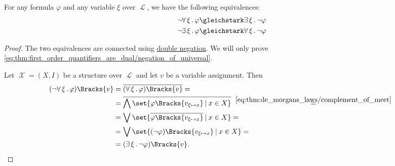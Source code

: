 \begin{proposition}\label{thm:first_order_quantifiers_are_dual}
  For any formula \( \varphi \) and any variable \( \xi \) over \( \mscrL \), we have the following equivalences:
  \begin{align}
    \neg \qforall \xi \varphi &\gleichstark \qexists \xi \neg \varphi \label{eq:thm:first_order_quantifiers_are_dual/negation_of_universal} \\
    \neg \qexists \xi \varphi &\gleichstark \qforall \xi \neg \varphi \label{eq:thm:first_order_quantifiers_are_dual/negation_of_existential}
  \end{align}
\end{proposition}
\begin{proof}
  The two equivalences are connected using \hyperref[thm:boolean_equivalences/double_negation]{double negation}. We will only prove \eqref{eq:thm:first_order_quantifiers_are_dual/negation_of_universal}.

  Let \( \mscrX = (X, I) \) be a structure over \( \mscrL \) and let \( v \) be a variable assignment. Then
  \begin{align*}
    (\neg \qforall \xi \varphi)\Bracks{v}
    &=
    \overline{(\qforall \xi \varphi)\Bracks{v}}
    = \\ &=
    \overline{\bigwedge\set{ \varphi\Bracks{v_{\xi \mapsto x}} \given x \in X }}
    \reloset {\eqref{eq:thm:de_morgans_laws/complement_of_meet}} = \\ &=
    \bigvee\set{ \overline{\varphi\Bracks{v_{\xi \mapsto x}}} \given x \in X }
    = \\ &=
    \bigvee\set{ (\neg \varphi)\Bracks{v_{\xi \mapsto x}} \given x \in X }
    = \\ &=
    (\qexists \xi \neg \varphi)\Bracks{v}.
  \end{align*}
\end{proof}

